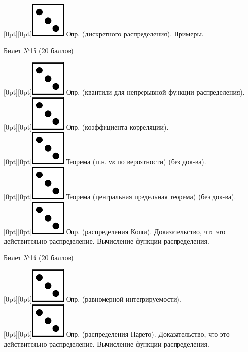 \documentclass[10pt]{article}
\begin{document}
\raisebox{-1pt}[0pt][0pt]{\includegraphics[width=0.02\linewidth]{3.png}} Опр. (дискретного распределения). Примеры. \\
\begin{center} {\Large Билет №15 (20 баллов)} \end{center}
\raisebox{-1pt}[0pt][0pt]{\includegraphics[width=0.02\linewidth]{3.png}}   Опр. (квантили для непрерывной функции распределения). \\
\raisebox{-1pt}[0pt][0pt]{\includegraphics[width=0.02\linewidth]{3.png}} Опр. (коэффициента корреляции). \\
\raisebox{-1pt}[0pt][0pt]{\includegraphics[width=0.02\linewidth]{3.png}} Теорема (п.н. vs по вероятности)  (без док-ва). \\
\raisebox{-1pt}[0pt][0pt]{\includegraphics[width=0.02\linewidth]{3.png}} Теорема (центральная предельная теорема) (без док-ва). \\
\raisebox{-1pt}[0pt][0pt]{\includegraphics[width=0.02\linewidth]{3.png}} Опр. (распределения Коши). Доказательство, что это действительно распределение. Вычисление функции распределения. \\
\begin{center} {\Large Билет №16 (20 баллов)} \end{center}
\raisebox{-1pt}[0pt][0pt]{\includegraphics[width=0.02\linewidth]{3.png}} Опр. (равномерной интегрируемости). \\
\raisebox{-1pt}[0pt][0pt]{\includegraphics[width=0.02\linewidth]{3.png}} Опр. (распределения Парето). Доказательство, что это действительно распределение. Вычисление функции распределения. \\
\end{document}
